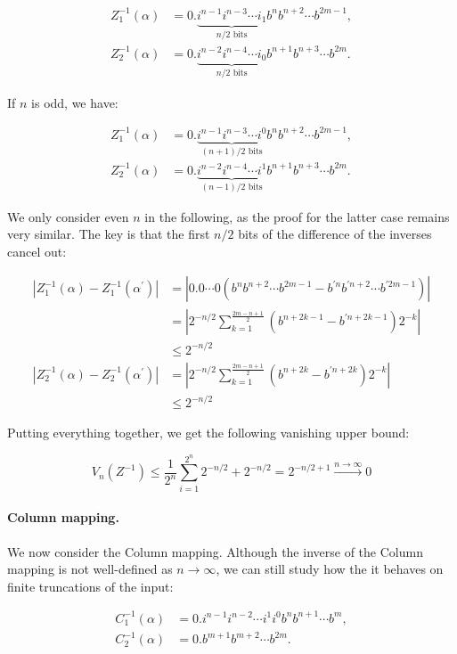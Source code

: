 \documentclass[10pt,letterpaper]{article}
\begin{document}
$$
\begin{aligned}
Z^{-1}_1(\alpha) &= 0.\underbrace{i^{n-1} i^{n-3} \cdots i_1}_\text{$n/2$ bits} b^n b^{n+2} \cdots b^{2m-1}, \\
Z^{-1}_2(\alpha) &= 0.\underbrace{i^{n-2} i^{n-4} \cdots i_0}_\text{$n/2$ bits} b^{n+1} b^{n+3} \cdots b^{2m}.
\end{aligned}
$$

If $n$ is odd, we have:

$$
\begin{aligned}
Z^{-1}_1(\alpha) &= 0.\underbrace{i^{n-1} i^{n-3} \cdots i^0}_\text{$(n+1)/2$ bits} b^n b^{n+2} \cdots b^{2m-1}, \\
Z^{-1}_2(\alpha) &= 0.\underbrace{i^{n-2} i^{n-4} \cdots i^1}_\text{$(n-1)/2$ bits} b^{n+1} b^{n+3} \cdots b^{2m}.
\end{aligned}
$$

We only consider even $n$ in the following, as the proof for the latter case remains very similar. The key is that the first $n/2$ bits of the difference of the inverses cancel out:

$$
\begin{aligned}
|Z^{-1}_1(\alpha) - Z^{-1}_1(\alpha^\prime)| &= \left|0.0 \cdots 0 (b^n b^{n+2} \cdots b^{2m-1} - b^{\prime n} b^{\prime n+2} \cdots b^{\prime 2m-1})\right| \\
&= \left|2^{-n/2} \sum_{k=1}^{\tfrac{2m-n+1}{2}} (b^{n+2k-1} - b^{\prime n+2k-1}) 2^{-k}\right| \\
&\leq 2^{-n/2} \\
|Z^{-1}_2(\alpha) - Z^{-1}_2(\alpha^\prime)| &= \left|2^{-n/2} \sum_{k=1}^{\tfrac{2m-n+1}{2}} (b^{n+2k} - b^{\prime n+2k}) 2^{-k}\right| \\
&\leq 2^{-n/2}
\end{aligned}
$$

Putting everything together, we get the following vanishing upper bound:

$$
V_n(Z^{-1}) \leq \frac{1}{2^n} \sum_{i=1}^{2^n} 2^{-n/2} + 2^{-n/2} = 2^{-n/2+1} \xrightarrow{n \to \infty} 0
$$

\paragraph{Column mapping.} We now consider the Column mapping. Although the inverse of the Column mapping is not well-defined as $n \to \infty$, we can still study how the it behaves on finite truncations of the input:

$$
\begin{aligned}
C^{-1}_1(\alpha) &= 0.i^{n-1} i^{n-2} \cdots i^1 i^0 b^n b^{n+1} \cdots b^m, \\
C^{-1}_2(\alpha) &= 0.b^{m+1} b^{m+2} \cdots b^{2m}.
\end{aligned}
$$
\end{document}
